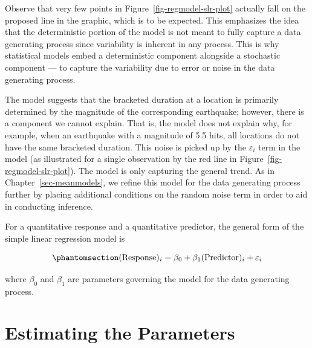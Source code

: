 \documentclass[
  letterpaper,
  DIV=11,
  numbers=noendperiod]{scrreprt}
\theoremstyle{plain}
\theoremstyle{definition}
\theoremstyle{definition}
\theoremstyle{remark}
\begin{document}
Observe that very few points in Figure~\ref{fig-regmodel-slr-plot}
actually fall on the proposed line in the graphic, which is to be
expected. This emphasizes the idea that the deterministic portion of the
model is not meant to fully capture a data generating process since
variability is inherent in any process. This is why statistical models
embed a deterministic component alongside a stochastic component --- to
capture the variability due to error or noise in the data generating
process.

The model suggests that the bracketed duration at a location is
primarily determined by the magnitude of the corresponding earthquake;
however, there is a component we cannot explain. That is, the model does
not explain why, for example, when an earthquake with a magnitude of 5.5
hits, all locations do not have the same bracketed duration. This noise
is picked up by the \(\varepsilon_i\) term in the model (as illustrated
for a single observation by the red line in
Figure~\ref{fig-regmodel-slr-plot}). The model is only capturing the
general trend. As in Chapter~\ref{sec-meanmodels}, we refine this model
for the data generating process further by placing additional conditions
on the random noise term in order to aid in conducting inference.

\begin{tcolorbox}[enhanced jigsaw, breakable, titlerule=0mm, colframe=quarto-callout-important-color-frame, bottomtitle=1mm, opacityback=0, rightrule=.15mm, toptitle=1mm, arc=.35mm, bottomrule=.15mm, left=2mm, title=\textcolor{quarto-callout-important-color}{\faExclamation}\hspace{0.5em}{Simple Linear Regression Model}, leftrule=.75mm, coltitle=black, toprule=.15mm, colbacktitle=quarto-callout-important-color!10!white, colback=white, opacitybacktitle=0.6]

For a quantitative response and a quantitative predictor, the general
form of the simple linear regression model is

\begin{equation}\phantomsection\label{eq-slr}{(\text{Response})_i = \beta_0 + \beta_1 (\text{Predictor})_i + \varepsilon_i}\end{equation}

where \(\beta_0\) and \(\beta_1\) are parameters governing the model for
the data generating process.

\end{tcolorbox}

\section{Estimating the Parameters}\label{estimating-the-parameters}
\end{document}
